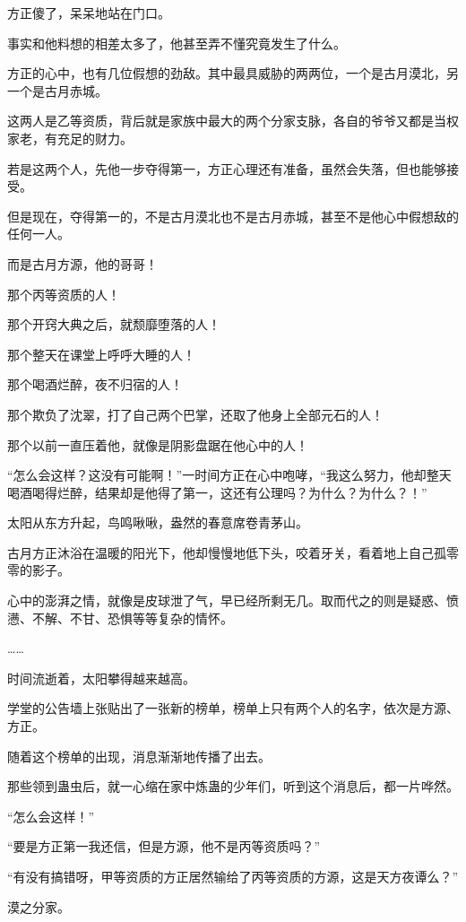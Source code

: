 \begin{this_body}
方正傻了，呆呆地站在门口。

事实和他料想的相差太多了，他甚至弄不懂究竟发生了什么。

方正的心中，也有几位假想的劲敌。其中最具威胁的两两位，一个是古月漠北，另一个是古月赤城。

这两人是乙等资质，背后就是家族中最大的两个分家支脉，各自的爷爷又都是当权家老，有充足的财力。

若是这两个人，先他一步夺得第一，方正心理还有准备，虽然会失落，但也能够接受。

但是现在，夺得第一的，不是古月漠北也不是古月赤城，甚至不是他心中假想敌的任何一人。

而是古月方源，他的哥哥！

那个丙等资质的人！

那个开窍大典之后，就颓靡堕落的人！

那个整天在课堂上呼呼大睡的人！

那个喝酒烂醉，夜不归宿的人！

那个欺负了沈翠，打了自己两个巴掌，还取了他身上全部元石的人！

那个以前一直压着他，就像是阴影盘踞在他心中的人！

“怎么会这样？这没有可能啊！”一时间方正在心中咆哮，“我这么努力，他却整天喝酒喝得烂醉，结果却是他得了第一，这还有公理吗？为什么？为什么？！”

太阳从东方升起，鸟鸣啾啾，盎然的春意席卷青茅山。

古月方正沐浴在温暖的阳光下，他却慢慢地低下头，咬着牙关，看着地上自己孤零零的影子。

心中的澎湃之情，就像是皮球泄了气，早已经所剩无几。取而代之的则是疑惑、愤懑、不解、不甘、恐惧等等复杂的情怀。

……

时间流逝着，太阳攀得越来越高。

学堂的公告墙上张贴出了一张新的榜单，榜单上只有两个人的名字，依次是方源、方正。

随着这个榜单的出现，消息渐渐地传播了出去。

那些领到蛊虫后，就一心缩在家中炼蛊的少年们，听到这个消息后，都一片哗然。

“怎么会这样！”

“要是方正第一我还信，但是方源，他不是丙等资质吗？”

“有没有搞错呀，甲等资质的方正居然输给了丙等资质的方源，这是天方夜谭么？”

漠之分家。


\end{this_body}
